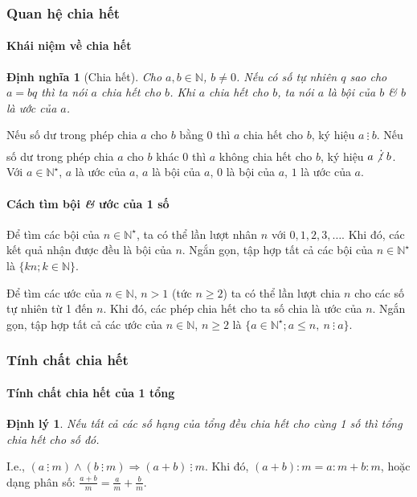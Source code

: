 \documentclass{article}
\numberwithin{equation}{section}
\newtheorem{dinhnghia}{Định nghĩa}[section]
\newtheorem{dinhly}{Định lý}[section]
\begin{document}
\subsubsection{Quan hệ chia hết}

\paragraph{Khái niệm về chia hết}
\begin{dinhnghia}[Chia hết]
	Cho $a,b\in\mathbb{N}$, $b\ne 0$. Nếu có số tự nhiên $q$ sao cho $a = bq$ thì ta nói \emph{$a$ chia hết cho $b$}. Khi $a$ chia hết cho $b$, ta nói $a$ là \emph{bội} của $b$ \textit{\&} $b$ là \emph{ước} của $a$.
\end{dinhnghia}
Nếu số dư trong phép chia $a$ cho $b$ bằng 0 thì $a$ chia hết cho $b$, ký hiệu $a\ \vdots\ b$. Nếu số dư trong phép chia $a$ cho $b$ khác 0 thì $a$ không chia hết cho $b$, ký hiệu $a\not\vdots\ b$. Với $a\in\mathbb{N}^\star$, $a$ là ước của $a$, $a$ là bội của $a$, 0 là bội của $a$, $1$ là ước của $a$.

\paragraph{Cách tìm bội \textit{\&} ước của 1 số}
Để tìm các bội của $n\in\mathbb{N}^\star$, ta có thể lần lượt nhân $n$ với $0,1,2,3,\ldots$. Khi đó, các kết quả nhận được đều là bội của $n$. Ngắn gọn, tập hợp tất cả các bội của $n\in\mathbb{N}^\star$ là $\{kn;k\in\mathbb{N}\}$.

Để tìm các ước của $n\in\mathbb{N}$, $n > 1$ (tức $n\ge 2$) ta có thể lần lượt chia $n$ cho các số tự nhiên từ 1 đến $n$. Khi đó, các phép chia hết cho ta số chia là ước của $n$. Ngắn gọn, tập hợp tất cả các ước của $n\in\mathbb{N}$, $n\ge 2$ là $\{a\in\mathbb{N}^\star;a\le n,\ n\ \vdots\ a\}$.

\subsubsection{Tính chất chia hết}

\paragraph{Tính chất chia hết của 1 tổng}
\begin{dinhly}
	Nếu tất cả các số hạng của tổng đều chia hết cho cùng 1 số thì tổng chia hết cho số đó.
\end{dinhly}
I.e., $(a\ \vdots\ m)\land(b\ \vdots\ m)\Rightarrow(a + b)\ \vdots\ m$. Khi đó, $(a + b):m = a:m + b:m$, hoặc dạng phân số: $\frac{a + b}{m} = \frac{a}{m} + \frac{b}{m}$.
\end{document}
